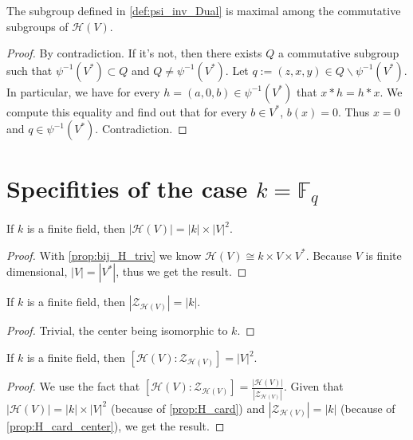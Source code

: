 \begin{proposition}
    \label{prop:psi_inv_Dual_max}
    \leanok

    The subgroup defined in \ref{def:psi_inv_Dual} is maximal among the
    commutative subgroups of $\mathcal{H}(V)$.
\end{proposition}
\begin{proof}
    \leanok 
    By contradiction. If it's not, then there exists $Q$ a commutative subgroup
    such that $\psi^{-1}(V^*)\subset Q$ and $Q\ne \psi^{-1}(V^*)$. Let $q:=(z,x,y)\in Q\backslash \psi^{-1}(V^*)$.
    In particular, we have for every $h=(a,0,b)\in \psi^{-1}(V^*)$ that $x*h=h*x$.
    We compute this equality and find out that for every $b\in V^*$, $b(x)=0$. Thus $x=0$ and $q\in \psi^{-1}(V^*)$.
    Contradiction.
\end{proof}

\section{Specifities of the case $k=\mathbb{F}_q$}

\begin{proposition}[Cardinality]
    \label{prop:H_card}
    \leanok
    If $k$ is a finite field, then $|\mathcal{H}(V)|=|k|\times|V|^2$.
\end{proposition}
\begin{proof}
    \leanok
    With \ref{prop:bij_H_triv} we know $\mathcal{H}(V)\cong k \times V \times V^*$.
    Because $V$ is finite dimensional, $|V|=|V^*|$, thus we get the result.
\end{proof}

\begin{proposition}
    \label{prop:H_card_center}
    \leanok
    If $k$ is a finite field, then $|\mathcal{Z}_{\mathcal{H}(V)}|=|k|$.
\end{proposition}
\begin{proof}
    \leanok
    Trivial, the center being isomorphic to $k$.
\end{proof}

\begin{theorem}
    \label{thm:H_index_center}
    \leanok

    If $k$ is a finite field, then $[\mathcal{H}(V):\mathcal{Z}_{\mathcal{H}(V)}]=|V|^2$.
\end{theorem}
\begin{proof}
    \leanok
    We use the fact that $[\mathcal{H}(V):\mathcal{Z}_{\mathcal{H}(V)}]=\frac{|\mathcal{H}(V)|}{|\mathcal{Z}_{\mathcal{H}(V)}|}$.
    Given that $|\mathcal{H}(V)|=|k|\times|V|^2$ (because of \ref{prop:H_card}) and $|\mathcal{Z}_{\mathcal{H}(V)}|=|k|$ (because of \ref{prop:H_card_center}), we get the result.
\end{proof}
